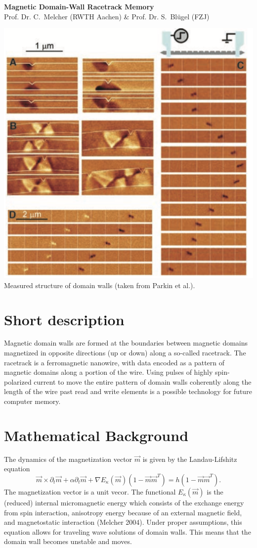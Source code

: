 \documentclass[english,pagenumoff]{rwth-document}
\begin{document}
	
	\begin{center}
		{ \bfseries\LARGE Magnetic Domain-Wall Racetrack Memory}\\[1ex]
		Prof. Dr. C.\ Melcher (RWTH Aachen) \& Prof. Dr. S.\ Bl\"ugel (FZJ)
	\end{center}




\begin{center}
\includegraphics[width=0.6\linewidth]{../figs/DomainWalls}\\
{\small Measured structure of domain walls (taken from Parkin et al.).}
\end{center}


\section*{Short description}
Magnetic domain walls are formed at the boundaries between magnetic domains magnetized in opposite directions (up or down) along a so-called racetrack. The racetrack is a ferromagnetic nanowire, with data encoded as a pattern of magnetic domains along a portion of the wire. Using pulses of highly spin-polarized current to move the entire pattern of domain walls coherently along the length of the wire past read and write elements is a possible technology for future computer memory.


\section*{Mathematical Background}
The dynamics of the magnetization vector $\vec{m}$ is given by the Landau-Lifshitz equation
$$
\vec{m}\times\partial_t \vec{m}+\alpha \partial_t \vec{m}+\nabla E_\kappa(\vec{m})(1-\vec{m}\vec{m}^T) = h(1-\vec{m}\vec{m}^T).
$$
The magnetization vector is a unit vecor. The functional $E_\kappa(\vec{m})$ is the (reduced) internal micromagnetic energy which consists of
the exchange energy from spin interaction, anisotropy energy because of an external magnetic field, and magnetostatic interaction (Melcher 2004). 
Under proper assumptions, this equation allows for traveling wave solutions of domain walls. This means that the domain wall becomes unstable and moves. 
\end{document}
